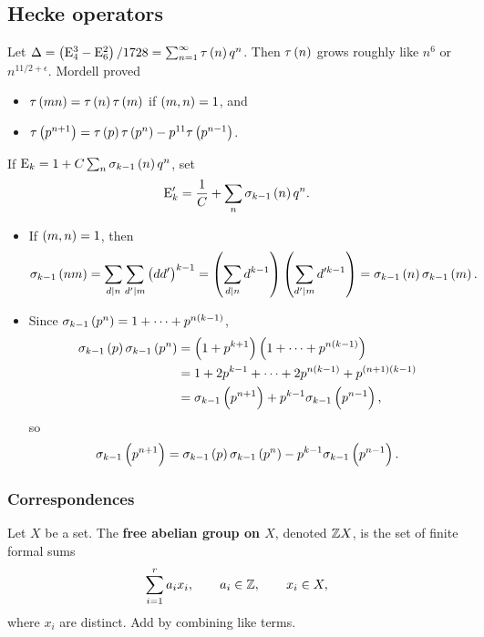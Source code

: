 \pagebreak

\subsection{Hecke operators}


Let $ \Delta = \br{\E_4^3 - \E_6^2} / 1728 = \sum_{n = 1}^\infty \tau\br{n}q^n $. Then $ \tau\br{n} $ grows roughly like $ n^6 $ or $ n^{11 / 2 + \epsilon} $. Mordell proved
\begin{itemize}
\item $ \tau\br{mn} = \tau\br{n}\tau\br{m} $ if $ \br{m, n} = 1 $, and
\item $ \tau\br{p^{n + 1}} = \tau\br{p}\tau\br{p^n} - p^{11}\tau\br{p^{n - 1}} $.
\end{itemize}
If $ \E_k = 1 + C\sum_n \sigma_{k - 1}\br{n}q^n $, set
$$ \E_k' = \dfrac{1}{C} + \sum_n \sigma_{k - 1}\br{n}q^n. $$

\begin{note*}
\hfill
\begin{itemize}
\item If $ \br{m, n} = 1 $, then
$$ \sigma_{k - 1}\br{nm} = \sum_{d \mid n} \sum_{d' \mid m} \br{dd'}^{k - 1} = \br{\sum_{d \mid n} d^{k - 1}}\br{\sum_{d' \mid m} d'^{k - 1}} = \sigma_{k - 1}\br{n}\sigma_{k - 1}\br{m}. $$
\item Since $ \sigma_{k - 1}\br{p^n} = 1 + \dots + p^{n\br{k - 1}} $,
\begin{align*}
\sigma_{k - 1}\br{p}\sigma_{k - 1}\br{p^n}
& = \br{1 + p^{k + 1}}\br{1 + \dots + p^{n\br{k - 1}}} \\
& = 1 + 2p^{k - 1} + \dots + 2p^{n\br{k - 1}} + p^{\br{n + 1}\br{k - 1}} \\
& = \sigma_{k - 1}\br{p^{n + 1}} + p^{k - 1}\sigma_{k - 1}\br{p^{n - 1}},
\end{align*}
so
$$ \sigma_{k - 1}\br{p^{n + 1}} = \sigma_{k - 1}\br{p}\sigma_{k - 1}\br{p^n} - p^{k - 1}\sigma_{k - 1}\br{p^{n - 1}}. $$
\end{itemize}
\end{note*}

\subsubsection{Correspondences}

\begin{definition}
Let $ X $ be a set. The \textbf{free abelian group on $ X $}, denoted $ \mathbb{Z} X $, is the set of finite formal sums
$$ \sum_{i = 1}^r a_ix_i, \qquad a_i \in \mathbb{Z}, \qquad x_i \in X, $$
where $ x_i $ are distinct. Add by combining like terms.
\end{definition}

